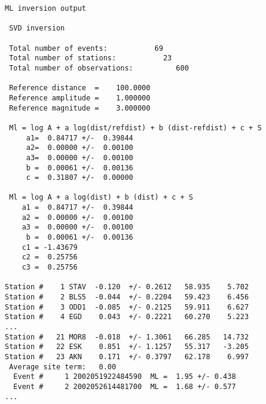 \begin{verbatim}
ML inversion output

 SVD inversion

 Total number of events:           69
 Total number of stations:           23
 Total number of observations:          600

 Reference distance  =    100.0000    
 Reference amplitude =    1.000000    
 Reference magnitude =    3.000000    

 Ml = log A + a log(dist/refdist) + b (dist-refdist) + c + S 
     a1=  0.84717 +/-  0.39844
     a2=  0.00000 +/-  0.00100
     a3=  0.00000 +/-  0.00100
     b =  0.00061 +/-  0.00136
     c =  0.31807 +/-  0.00000

 Ml = log A + a log(dist) + b (dist) + c + S 
    a1 =  0.84717 +/-  0.39844
    a2 =  0.00000 +/-  0.00100
    a3 =  0.00000 +/-  0.00100                                                                    
     b =  0.00061 +/-  0.00136
    c1 = -1.43679
    c2 =  0.25756
    c3 =  0.25756

Station #    1 STAV  -0.120  +/- 0.2612   58.935    5.702
Station #    2 BLS5  -0.044  +/- 0.2204   59.423    6.456
Station #    3 ODD1  -0.085  +/- 0.2125   59.911    6.627
Station #    4 EGD    0.043  +/- 0.2221   60.270    5.223
...
Station #   21 MOR8  -0.018  +/- 1.3061   66.285   14.732
Station #   22 ESK    0.851  +/- 1.1257   55.317   -3.205
Station #   23 AKN    0.171  +/- 0.3797   62.178    6.997
 Average site term:   0.00
  Event #     1 2002051922484590  ML =  1.95 +/- 0.438
  Event #     2 2002052614481700  ML =  1.68 +/- 0.577
...
\end{verbatim}

